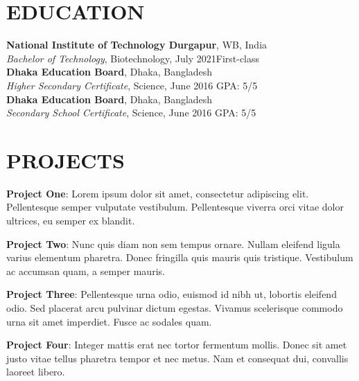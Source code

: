\documentclass[12pt,margin]{res}
\begin{document}
\begin{resume}

\section{EDUCATION}
\textbf{National Institute of Technology Durgapur}, WB, India\\
{\sl Bachelor of Technology}, Biotechnology, July 2021\hfill First-class
\\
\textbf{Dhaka Education Board}, Dhaka, Bangladesh\\
{\sl Higher Secondary Certificate}, Science, June 2016\hfill 
GPA: 5/5
\\
\textbf{Dhaka Education Board}, Dhaka, Bangladesh\\
{\sl Secondary School Certificate}, Science, June 2016\hfill 
GPA: 5/5

\section{PROJECTS}
\par
\textbf{Project One}: 
Lorem ipsum dolor sit amet, consectetur adipiscing elit. Pellentesque semper 
vulputate vestibulum. Pellentesque viverra orci vitae dolor ultrices, eu semper 
ex blandit. 
\par
\textbf{Project Two}:
Nunc quis diam non sem tempus ornare. Nullam eleifend ligula varius 
elementum pharetra. Donec fringilla quis mauris quis tristique. Vestibulum ac 
accumsan quam, a semper mauris. 
\par
\textbf{Project Three}: 
Pellentesque urna odio, euismod id nibh ut,  lobortis eleifend odio. Sed 
placerat arcu pulvinar dictum egestas. Vivamus  scelerisque commodo urna sit 
amet imperdiet. Fusce ac sodales quam.
\par
\textbf{Project Four}: 
Integer mattis erat nec tortor fermentum mollis. Donec sit amet justo vitae 
tellus pharetra tempor et nec metus. Nam et consequat dui, convallis laoreet 
libero. 


\end{resume}
\end{document}
